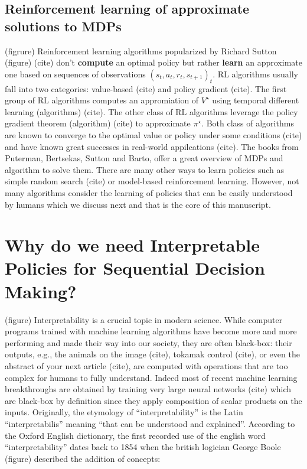 \subsection{Reinforcement learning of approximate solutions to MDPs}
(figrure)
Reinforcement learning algorithms popularized by Richard Sutton (figure) (cite) don't \textbf{compute} an optimal policy but rather \textbf{learn} an approximate one based on sequences of observations ${(s_t, a_t, r_t, s_{t+1})}_t$.
RL algorithms usually fall into two categories: value-based (cite) and policy gradient (cite). The first group of RL algorithms computes an appromiation of $V^{\star}$ using temporal different learning (algorithms) (cite). The other class of RL algorithms leverage the policy gradient theorem (algorithm) (cite) to approximate $\pi^{\star}$.
Both class of algorithms are known to converge to the optimal value or policy under some conditions (cite) and have known great successes in real-world appilcations (cite).
The books from Puterman, Bertsekas, Sutton and Barto, offer a great overview of MDPs and algorithm to solve them.
There are many other ways to learn policies such as simple random search (cite) or model-based reinforcement learning. However, not many algorithms consider the learning of policies that can be easily understood by humans which we discuss next and that is the core of this manuscript.
\section{Why do we need Interpretable Policies for Sequential Decision Making?} 
(figure)
Interpretability is a crucial topic in modern science. While computer programs trained with machine learning algorithms have become more and more performing and made their way into our society, they are often black-box: their outputs, e.g., the animals on the image (cite), tokamak control (cite), or even the abstract of your next article (cite), are computed with operations that are too complex for humans to fully understand.
Indeed most of recent machine learning breakthroughs are obtained by training very large neural networks (cite) which are black-box by definition since they apply composition of scalar products on the inputs.
Originally, the etymology of ``interpretability'' is the Latin ``interpretabilis'' meaning ``that can be understood and explained''.
According to the Oxford English dictionary, the first recorded use of the english word ``interpretability'' dates back to 1854 when the british logician George Boole (figure) described the addition of concepts:

